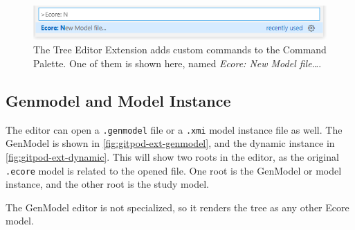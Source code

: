 \begin{figure}[H]  %
  \centering
  \includegraphics[width=\textwidth]{figures/gitpod-vscode-newmodel.png}
  \caption[Tree Editor Extension Custom Commands]{The Tree Editor Extension adds custom commands to the Command Palette. One of them is shown here, named \textit{Ecore: New Model file\ldots}.}\label{fig:gitpod-ext-newmodel}
\end{figure}

\subsection{Genmodel and Model Instance}

The editor can open a \texttt{.genmodel} file or a \texttt{.xmi} model instance file as well.
The GenModel is shown in \cref{fig:gitpod-ext-genmodel}, and the dynamic instance in \cref{fig:gitpod-ext-dynamic}.
This will show two roots in the editor, as the original \texttt{.ecore} model is related to the opened file.
One root is the GenModel or model instance, and the other root is the study model.

The GenModel editor is not specialized, so it renders the tree as any other \gls{Ecore} model.

